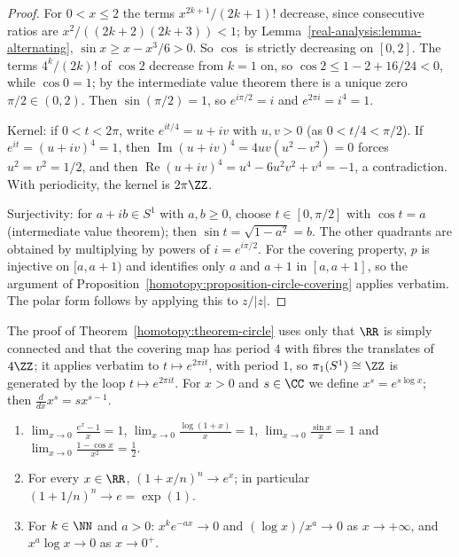\begin{proof}
For $0 < x \leq 2$ the terms $x^{2k+1}/(2k+1)!$ decrease, since consecutive ratios are $x^2/((2k+2)(2k+3)) < 1$; by Lemma~\ref{real-analysis:lemma-alternating},
$\sin x \geq x - x^3/6 > 0$. So $\cos$ is strictly decreasing on $[0, 2]$. The terms $4^k/(2k)!$ of $\cos 2$ decrease from $k = 1$ on, so $\cos 2 \leq 1 - 2 + 16/24 < 0$, while $\cos 0 = 1$; by
the intermediate value theorem there is a unique zero $\pi/2 \in (0, 2)$. Then $\sin(\pi/2) = 1$, so $e^{i\pi/2} = i$ and $e^{2\pi i} = i^4 = 1$.

Kernel: if $0 < t < 2\pi$, write $e^{it/4} = u + iv$ with $u, v > 0$ (as $0 < t/4 < \pi/2$). If $e^{it} = (u + iv)^4 = 1$, then $\operatorname{Im}(u + iv)^4 = 4uv(u^2 - v^2) = 0$ forces $u^2 = v^2 = 1/2$, and then
$\operatorname{Re}(u + iv)^4 = u^4 - 6u^2v^2 + v^4 = -1$, a contradiction. With periodicity, the kernel is $2\pi\ZZ$.

Surjectivity: for $a + ib \in S^1$ with $a, b \geq 0$, choose $t \in [0, \pi/2]$ with $\cos t = a$ (intermediate value theorem); then $\sin t = \sqrt{1 - a^2} = b$. The other quadrants are obtained by
multiplying by powers of $i = e^{i\pi/2}$. For the covering property, $p$ is injective on $[a, a + 1)$ and identifies only $a$ and $a + 1$ in $[a, a + 1]$, so the argument of
Proposition~\ref{homotopy:proposition-circle-covering} applies verbatim. The polar form follows by applying this to $z/|z|$.
\end{proof}

\begin{remark}\label{real-analysis:remark-exponential-covering}
The proof of Theorem~\ref{homotopy:theorem-circle} uses only that $\RR$ is simply connected and that the covering map has period $4$ with fibres the translates of $4\ZZ$; it applies verbatim to
$t \mapsto e^{2\pi it}$, with period $1$, so $\pi_1(S^1) \cong \ZZ$ is generated by the loop $t \mapsto e^{2\pi it}$. For $x > 0$ and $s \in \CC$ we define $x^s = e^{s\log x}$; then $\frac{d}{dx}x^s = sx^{s-1}$.
\end{remark}

\begin{proposition}\label{real-analysis:proposition-notable-limits}
\begin{enumerate}
\item $\lim_{x \to 0}\frac{e^x - 1}{x} = 1$, $\lim_{x \to 0}\frac{\log(1 + x)}{x} = 1$, $\lim_{x \to 0}\frac{\sin x}{x} = 1$ and $\lim_{x \to 0}\frac{1 - \cos x}{x^2} = \frac12$.
\item For every $x \in \RR$, $(1 + x/n)^n \to e^x$; in particular $(1 + 1/n)^n \to e = \exp(1)$.
\item For $k \in \NN$ and $a > 0$: $x^ke^{-ax} \to 0$ and $(\log x)/x^a \to 0$ as $x \to +\infty$, and $x^a\log x \to 0$ as $x \to 0^+$.
\end{enumerate}
\end{proposition}

